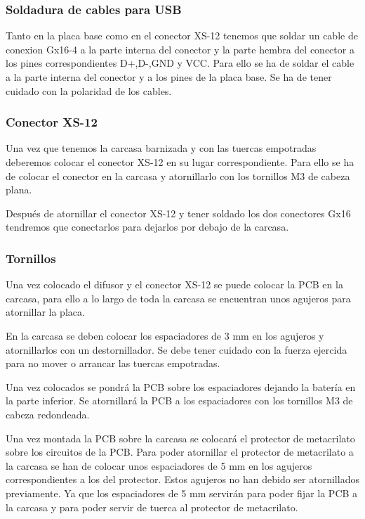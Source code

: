 \subsubsection{Soldadura de cables para \gls{USB}}
Tanto en la placa base como en el conector XS-12 tenemos que soldar un cable de conexion Gx16-4 a la parte interna del conector y la parte hembra del conector a los pines correspondientes D+,D-,GND y VCC. Para ello se ha de soldar el cable a la parte interna del conector y a los pines de la placa base. Se ha de tener cuidado con la polaridad de los cables.

\subsubsection{Conector XS-12}
Una vez que tenemos la carcasa barnizada y con las tuercas empotradas deberemos colocar el conector XS-12 en su lugar correspondiente. Para ello se ha de colocar el conector en la carcasa y atornillarlo con los tornillos M3 de cabeza plana.

Después de atornillar el conector XS-12 y tener soldado los dos conectores Gx16 tendremos que conectarlos para dejarlos por debajo de la carcasa.

\subsubsection{Tornillos}
Una vez colocado el difusor y el conector XS-12 se puede colocar la \gls{PCB} en la carcasa, para ello a lo largo de toda la carcasa se encuentran unos agujeros para atornillar la placa.

En la carcasa se deben colocar los espaciadores de 3 mm en los agujeros y atornillarlos con un destornillador. Se debe tener cuidado con la fuerza ejercida para no mover o arrancar las tuercas empotradas.

Una vez colocados se pondrá la \gls{PCB} sobre los espaciadores dejando la batería en la parte inferior. Se atornillará la \gls{PCB} a los espaciadores con los tornillos M3 de cabeza redondeada.

Una vez montada la \gls{PCB} sobre la carcasa se colocará el protector de metacrilato sobre los circuitos de la \gls{PCB}. Para poder atornillar el protector de metacrilato a la carcasa se han de colocar unos espaciadores de 5 mm en los agujeros correspondientes a los del protector. Estos agujeros no han debido ser atornillados previamente. Ya que los espaciadores de 5 mm servirán para poder fijar la \gls{PCB} a la carcasa y para poder servir de tuerca al protector de metacrilato.

